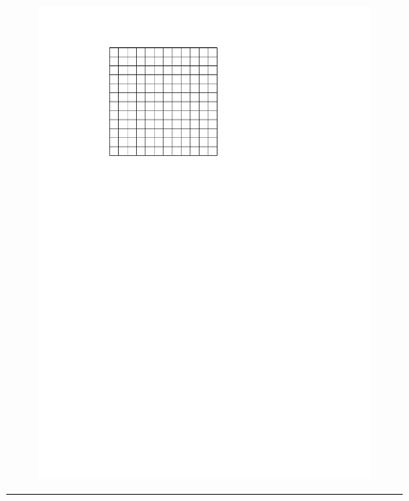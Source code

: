 \documentclass[12pt]{article}
\newcommand{\horrule}[1]{\rule{\linewidth}{#1}} %
\begin{document}
\begin{figure}[H]
  \centering
  \includegraphics[width=0.7\linewidth]{sources/1/grille-dm.pdf}
\end{figure}

\horrule{1px}
\end{document}
